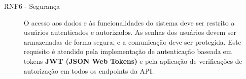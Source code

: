 \begin{description}
    \item [RNF6 - Segurança] O acesso aos dados e às funcionalidades do sistema deve ser restrito a usuários autenticados e autorizados. As senhas dos usuários devem ser armazenadas de forma segura, e a comunicação deve ser protegida. Este requisito é atendido pela implementação de autenticação baseada em tokens \textbf{JWT (JSON Web Tokens)} e pela aplicação de verificações de autorização em todos os endpoints da API.
\end{description}
